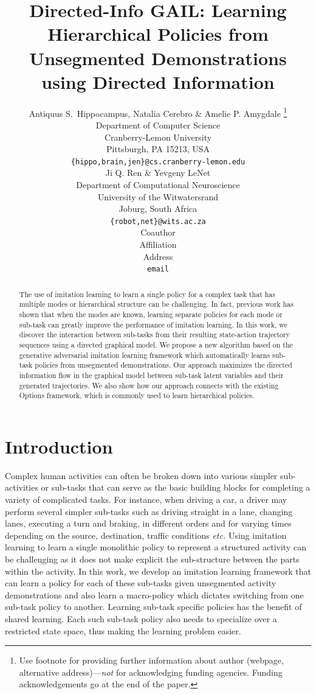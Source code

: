 \documentclass{article} %
\title{Directed-Info GAIL: Learning Hierarchical Policies from Unsegmented Demonstrations using Directed Information}
\author{Antiquus S.~Hippocampus, Natalia Cerebro \& Amelie P. Amygdale \thanks{ Use footnote for providing further information
about author (webpage, alternative address)---\emph{not} for acknowledging
funding agencies.  Funding acknowledgements go at the end of the paper.} \\
Department of Computer Science\\
Cranberry-Lemon University\\
Pittsburgh, PA 15213, USA \\
\texttt{\{hippo,brain,jen\}@cs.cranberry-lemon.edu} \\
\And
Ji Q. Ren \& Yevgeny LeNet \\
Department of Computational Neuroscience \\
University of the Witwatersrand \\
Joburg, South Africa \\
\texttt{\{robot,net\}@wits.ac.za} \\
\AND
Coauthor \\
Affiliation \\
Address \\
\texttt{email}
}
\begin{document}
\maketitle

\begin{abstract}
The use of imitation learning to learn a single policy for a complex task that has multiple modes or hierarchical structure can be challenging. In fact, previous work has shown that when the modes are known, learning separate policies for each mode or sub-task can greatly improve the performance of imitation learning. In this work, we discover the interaction between sub-tasks from their resulting state-action trajectory sequences using a directed graphical model. We propose a new algorithm based on the generative adversarial imitation learning framework which automatically learns sub-task policies from unsegmented demonstrations. Our approach maximizes the directed information flow in the graphical model between sub-task latent variables and their generated trajectories. We also show how our approach connects with the existing Options framework, which is commonly used to learn hierarchical policies. %
\end{abstract}


\section{Introduction}

Complex human activities can often be broken down into various simpler sub-activities or sub-tasks that can serve as the basic building blocks for completing a variety of complicated tasks. For instance, when driving a car, a driver may perform several simpler sub-tasks such as driving straight in a lane, changing lanes, executing a turn and braking, in different orders and for varying times depending on the source, destination, traffic conditions \emph{etc.} Using imitation learning to learn a single monolithic policy to represent a structured activity can be challenging as it does not make explicit the sub-structure between the parts within the activity. In this work, we develop an imitation learning framework that can learn a policy for each of these sub-tasks given unsegmented activity demonstrations and also learn a macro-policy which dictates switching from one sub-task policy to another. Learning sub-task specific policies has the benefit of shared learning. Each such sub-task policy also needs to specialize over a restricted state space, thus making the learning problem easier.
\end{document}
